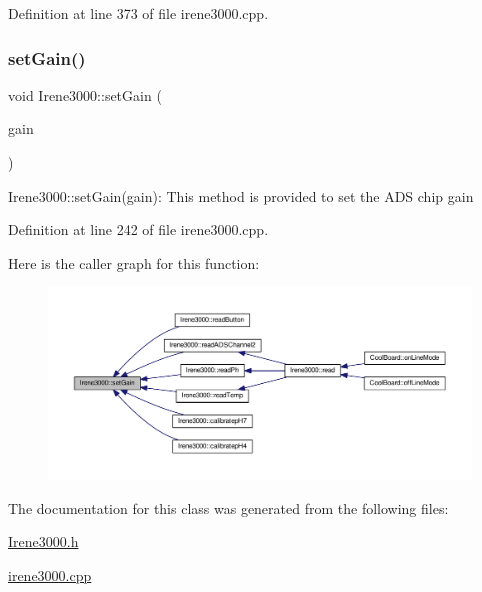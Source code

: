Definition at line 373 of file irene3000.\+cpp.

\mbox{\label{class_irene3000_aff7c5da186b388e7272e63ff88a20c34}} 
\subsubsection{\texorpdfstring{set\+Gain()}{setGain()}}
{\footnotesize\ttfamily void Irene3000\+::set\+Gain (\begin{DoxyParamCaption}\item[{ads\+Gain\+\_\+t}]{gain }\end{DoxyParamCaption})}

Irene3000\+::set\+Gain(gain)\+: This method is provided to set the A\+DS chip gain 

Definition at line 242 of file irene3000.\+cpp.

Here is the caller graph for this function\+:
\nopagebreak
\begin{figure}[H]
\begin{center}
\leavevmode
\includegraphics[width=350pt]{d6/d03/class_irene3000_aff7c5da186b388e7272e63ff88a20c34_icgraph}
\end{center}
\end{figure}


The documentation for this class was generated from the following files\+:\begin{DoxyCompactItemize}
\item 
\hyperlink{_irene3000_8h}{Irene3000.\+h}\item 
\hyperlink{irene3000_8cpp}{irene3000.\+cpp}\end{DoxyCompactItemize}
